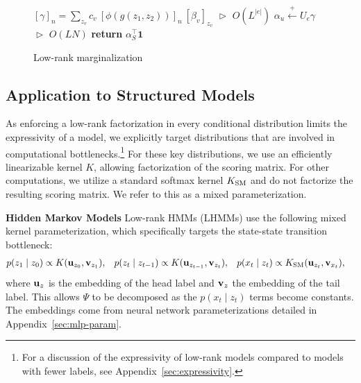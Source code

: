 \documentclass{article}
\begin{document}
\begin{figure}
\begin{minipage}{0.55\textwidth}
\begin{algorithm}[H]
\caption{\label{alg:low-rank-update} Low-rank marginalization}
\begin{algorithmic} 
\STATE \hspace*{-0.2cm}$[\gamma]_n = \displaystyle \sum_{z_v} c_v\  [\phi(g(z_{1}, z_{2}))]_n \  [\beta_{v}]_{z_v}$
\hfill $\vartriangleright$ $O(L^{|e|})$
\ENDFOR
\STATE $\alpha_u \stackrel{+}{\gets} U_e\gamma $
    \hfill $\vartriangleright$ $O(LN)$
\ENDFOR
\STATE \textbf{return} $\alpha_S^\top\mathbf{1}$
\end{algorithmic} 
\end{algorithm}
\end{minipage}
\end{figure}

\subsection{Application to Structured Models}
As enforcing a low-rank factorization in every conditional distribution limits the expressivity of a model,
we explicitly target distributions that are involved in computational bottlenecks.\footnote{For a discussion of the expressivity of low-rank models compared to models with fewer labels, see Appendix~\ref{sec:expressivity}.}
For these key distributions, we use an efficiently linearizable kernel $K$, allowing factorization of the scoring matrix.
For other computations, we utilize a standard softmax kernel $K_{\mathrm{SM}}$ and do not factorize the resulting scoring matrix.
We refer to this as a mixed parameterization.

\textbf{Hidden Markov Models}
Low-rank HMMs (LHMMs) use the following mixed kernel parameterization, which specifically targets the state-state transition bottleneck:
\begin{equation}
\begin{aligned}
p(z_1 \mid z_0) &\propto K(\mathbf{u}_{z_0}, \mathbf{v}_{z_1}),&
p(z_t \mid z_{t-1}) &\propto K(\mathbf{u}_{z_{t-1}}, \mathbf{v}_{z_t}),&
p(x_t \mid z_t) &\propto K_{\mathrm{SM}}(\mathbf{u}_{z_t}, \mathbf{v}_{x_t}),
\end{aligned}
\end{equation}
where $\mathbf{u}_{z}$ is the embedding of the head label and $\mathbf{v}_{z}$
the embedding of the tail label. 
This allows $\Psi$ to be decomposed as the $p(x_t\mid z_t)$ terms become constants.
The embeddings come from neural network parameterizations detailed in Appendix~\ref{sec:mlp-param}.
\end{document}
